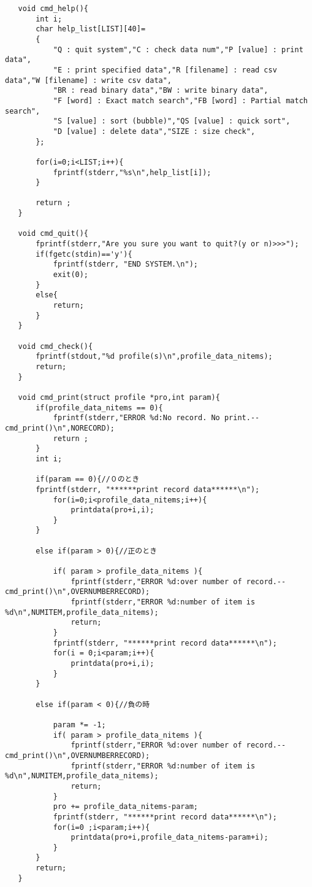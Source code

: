 \documentclass[a4j,11pt]{jarticle}
\begin{document}
\begin{lstlisting}
   void cmd_help(){
       int i;
       char help_list[LIST][40]=
       {
           "Q : quit system","C : check data num","P [value] : print data",
           "E : print specified data","R [filename] : read csv data","W [filename] : write csv data",
           "BR : read binary data","BW : write binary data",
           "F [word] : Exact match search","FB [word] : Partial match search",
           "S [value] : sort (bubble)","QS [value] : quick sort",
           "D [value] : delete data","SIZE : size check",
       };
   
       for(i=0;i<LIST;i++){
           fprintf(stderr,"%s\n",help_list[i]);
       }
   
       return ;
   }
   
   void cmd_quit(){
       fprintf(stderr,"Are you sure you want to quit?(y or n)>>>");
       if(fgetc(stdin)=='y'){
           fprintf(stderr, "END SYSTEM.\n");
           exit(0);
       }
       else{
           return; 
       }
   }
   
   void cmd_check(){
       fprintf(stdout,"%d profile(s)\n",profile_data_nitems);
       return;
   }
   
   void cmd_print(struct profile *pro,int param){
       if(profile_data_nitems == 0){
           fprintf(stderr,"ERROR %d:No record. No print.--cmd_print()\n",NORECORD);
           return ;
       }
       int i;
       
       if(param == 0){//０のとき
       fprintf(stderr, "******print record data******\n");
           for(i=0;i<profile_data_nitems;i++){
               printdata(pro+i,i);
           }
       }
       
       else if(param > 0){//正のとき
           
           if( param > profile_data_nitems ){
               fprintf(stderr,"ERROR %d:over number of record.--cmd_print()\n",OVERNUMBERRECORD);
               fprintf(stderr,"ERROR %d:number of item is %d\n",NUMITEM,profile_data_nitems);
               return;
           }
           fprintf(stderr, "******print record data******\n");
           for(i = 0;i<param;i++){
               printdata(pro+i,i);
           }
       }
       
       else if(param < 0){//負の時
           
           param *= -1;
           if( param > profile_data_nitems ){
               fprintf(stderr,"ERROR %d:over number of record.--cmd_print()\n",OVERNUMBERRECORD);
               fprintf(stderr,"ERROR %d:number of item is %d\n",NUMITEM,profile_data_nitems);
               return;
           }
           pro += profile_data_nitems-param;
           fprintf(stderr, "******print record data******\n");
           for(i=0 ;i<param;i++){
               printdata(pro+i,profile_data_nitems-param+i);
           }
       }
       return;
   }
   

\end{lstlisting}
\end{document}

